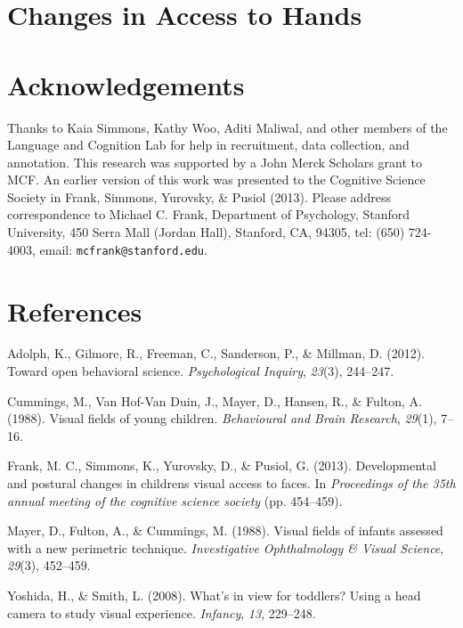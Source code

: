 \documentclass[10pt, letterpaper]{article}
\begin{document}
\section{Changes in Access to Hands}\label{changes-in-access-to-hands}

\section{Acknowledgements}\label{acknowledgements}

Thanks to Kaia Simmons, Kathy Woo, Aditi Maliwal, and other members of
the Language and Cognition Lab for help in recruitment, data collection,
and annotation. This research was supported by a John Merck Scholars
grant to MCF. An earlier version of this work was presented to the
Cognitive Science Society in Frank, Simmons, Yurovsky, \& Pusiol (2013).
Please address correspondence to Michael C. Frank, Department of
Psychology, Stanford University, 450 Serra Mall (Jordan Hall), Stanford,
CA, 94305, tel: (650) 724-4003, email: \texttt{mcfrank@stanford.edu}.

\section{References}\label{references}

\setlength{\parindent}{-0.1in} \setlength{\leftskip}{0.125in} \noindent

\hypertarget{refs}{}
\hypertarget{ref-adolph2012}{}
Adolph, K., Gilmore, R., Freeman, C., Sanderson, P., \& Millman, D.
(2012). Toward open behavioral science. \emph{Psychological Inquiry},
\emph{23}(3), 244--247.

\hypertarget{ref-cummings1988}{}
Cummings, M., Van Hof-Van Duin, J., Mayer, D., Hansen, R., \& Fulton, A.
(1988). Visual fields of young children. \emph{Behavioural and Brain
Research}, \emph{29}(1), 7--16.

\hypertarget{ref-frank2013}{}
Frank, M. C., Simmons, K., Yurovsky, D., \& Pusiol, G. (2013).
Developmental and postural changes in childrens visual access to faces.
In \emph{Proceedings of the 35th annual meeting of the cognitive science
society} (pp. 454--459).

\hypertarget{ref-mayer1988}{}
Mayer, D., Fulton, A., \& Cummings, M. (1988). Visual fields of infants
assessed with a new perimetric technique. \emph{Investigative
Ophthalmology \& Visual Science}, \emph{29}(3), 452--459.

\hypertarget{ref-yoshida2008}{}
Yoshida, H., \& Smith, L. (2008). What's in view for toddlers? Using a
head camera to study visual experience. \emph{Infancy}, \emph{13},
229--248.
\end{document}
